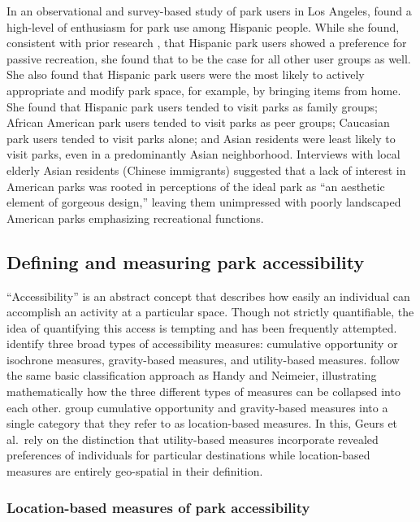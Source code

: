 \documentclass[3p, authoryear, review]{elsarticle} %
\begin{document}
In an observational and survey-based study of park users in Los Angeles,
\citet{loukaitou1995urban} found a high-level of enthusiasm for park use among Hispanic
people. While she found, consistent with prior research \citep{baas1993influence, hutchison1987ethnicity, irwin1990mexican}, that Hispanic park users showed a
preference for passive recreation, she found that to be the case for all other
user groups as well. She also found that Hispanic park users were the most
likely to actively appropriate and modify park space, for example, by bringing
items from home. She found that Hispanic park users tended to visit parks as
family groups; African American park users tended to visit parks as peer groups;
Caucasian park users tended to visit parks alone; and Asian residents were least
likely to visit parks, even in a predominantly Asian neighborhood. Interviews
with local elderly Asian residents (Chinese immigrants) suggested that a lack of
interest in American parks was rooted in perceptions of the ideal park as ``an
aesthetic element of gorgeous design,'' leaving them unimpressed with poorly
landscaped American parks emphasizing recreational functions.

\hypertarget{defining-and-measuring-park-accessibility}{%
\subsection{Defining and measuring park accessibility}\label{defining-and-measuring-park-accessibility}}

``Accessibility'' is an abstract concept that describes how easily an individual
can accomplish an activity at a particular space. Though not strictly
quantifiable, the idea of quantifying this access is tempting and has been
frequently attempted.
\citet{Handy1997} identify three broad types of accessibility measures: cumulative
opportunity or isochrone measures, gravity-based measures, and utility-based measures.
\citet{Dong2006} follow the same basic classification approach as Handy and Neimeier,
illustrating mathematically how the three different types of measures can be
collapsed into each other.
\citet{GEURS2004127} group cumulative opportunity and gravity-based measures into
a single category that they refer to as location-based measures. In this,
Geurs et al.~rely on the distinction that utility-based measures incorporate revealed
preferences of individuals for particular destinations while location-based
measures are entirely geo-spatial in their definition.

\hypertarget{location-based-measures-of-park-accessibility}{%
\subsubsection{Location-based measures of park accessibility}\label{location-based-measures-of-park-accessibility}}
\end{document}
